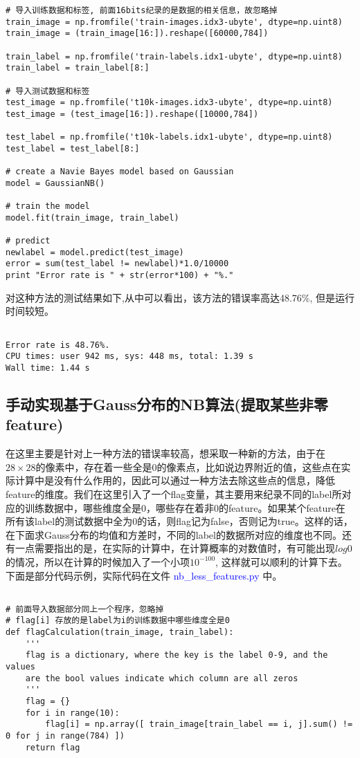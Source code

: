 \documentclass[a4paper, 1pt]{article}
\begin{document}
\begin{spacing}{1.2}
\begin{lstlisting}
# 导入训练数据和标签, 前面16bits纪录的是数据的相关信息，故忽略掉
train_image = np.fromfile('train-images.idx3-ubyte', dtype=np.uint8)
train_image = (train_image[16:]).reshape([60000,784])

train_label = np.fromfile('train-labels.idx1-ubyte', dtype=np.uint8)
train_label = train_label[8:]

# 导入测试数据和标签
test_image = np.fromfile('t10k-images.idx3-ubyte', dtype=np.uint8)
test_image = (test_image[16:]).reshape([10000,784])

test_label = np.fromfile('t10k-labels.idx1-ubyte', dtype=np.uint8)
test_label = test_label[8:]

# create a Navie Bayes model based on Gaussian
model = GaussianNB()

# train the model
model.fit(train_image, train_label)

# predict 
newlabel = model.predict(test_image)
error = sum(test_label != newlabel)*1.0/10000
print "Error rate is " + str(error*100) + "%."
\end{lstlisting}

对这种方法的测试结果如下,从中可以看出，该方法的错误率高达48.76\%, 但是运行时间较短。
\begin{lstlisting}

Error rate is 48.76%.
CPU times: user 942 ms, sys: 448 ms, total: 1.39 s
Wall time: 1.44 s
\end{lstlisting}
\subsection{手动实现基于Gauss分布的NB算法(提取某些非零feature)}
在这里主要是针对上一种方法的错误率较高，想采取一种新的方法，由于在$28\times 28$的像素中，存在着一些全是0的像素点，比如说边界附近的值，这些点在实际计算中是没有什么作用的，因此可以通过一种方法去除这些点的信息，降低feature的维度。我们在这里引入了一个flag变量，其主要用来纪录不同的label所对应的训练数据中，哪些维度全是0，哪些存在着非0的feature。如果某个feature在所有该label的测试数据中全为0的话，则flag记为false，否则记为true。这样的话，在下面求Gauss分布的均值和方差时，不同的label的数据所对应的维度也不同。还有一点需要指出的是，在实际的计算中，在计算概率的对数值时，有可能出现$log 0$的情况，所以在计算的时候加入了一个小项$10^{-100}$, 这样就可以顺利的计算下去。下面是部分代码示例，实际代码在文件 \textcolor{blue}{ nb\_less\_features.py} 中。
\begin{lstlisting}

# 前面导入数据部分同上一个程序，忽略掉
# flag[i] 存放的是label为i的训练数据中哪些维度全是0
def flagCalculation(train_image, train_label):
    '''
    flag is a dictionary, where the key is the label 0-9, and the values
    are the bool values indicate which column are all zeros
    '''
    flag = {}
    for i in range(10):
        flag[i] = np.array([ train_image[train_label == i, j].sum() != 0 for j in range(784) ])
    return flag


\end{lstlisting}
\end{spacing}
\end{document}
